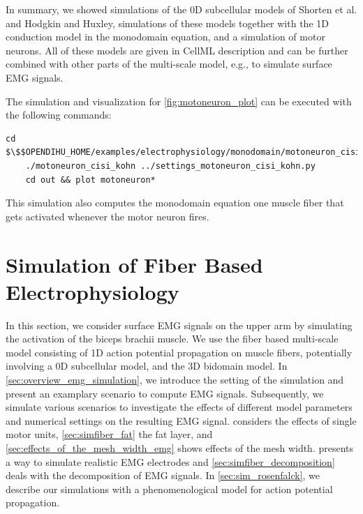 In summary, we showed simulations of the 0D subcellular models of Shorten et al. and Hodgkin and Huxley, simulations of these models together with the 1D conduction model in the monodomain equation, and a simulation of motor neurons. All of these models are given in CellML description and can be further combined with other parts of the multi-scale model, e.g., to simulate surface EMG signals.

\begin{reproduce_no_break}
  The simulation and visualization for \cref{fig:motoneuron_plot} can be executed with the following commands:
  \begin{lstlisting}[columns=fullflexible,breaklines=true,postbreak=\mbox{\textcolor{gray}{$\hookrightarrow$}\space}]
    cd $\$$OPENDIHU_HOME/examples/electrophysiology/monodomain/motoneuron_cisi_kohn/build_release
    ./motoneuron_cisi_kohn ../settings_motoneuron_cisi_kohn.py
    cd out && plot motoneuron*
  \end{lstlisting}
  This simulation also computes the monodomain equation one muscle fiber that gets activated whenever the motor neuron fires.
\end{reproduce_no_break}



\section{Simulation of Fiber Based Electrophysiology}\label{sec:results_fiber_based_electrophysiology}

In this section, we consider surface EMG signals on the upper arm by simulating the activation of the biceps brachii muscle. We use the fiber based multi-scale model consisting of 1D action potential propagation on muscle fibers, potentially involving a 0D subcellular model, and the 3D bidomain model.
In \cref{sec:overview_emg_simulation}, we introduce the setting of the simulation and present an examplary scenario to compute EMG signals.
Subsequently, we simulate various scenarios to investigate the effects of different model parameters and numerical settings on the resulting EMG signal.  considers the effects of single motor units, \cref{sec:simfiber_fat} the fat layer, and \cref{sec:effects_of_the_mesh_width_emg} shows effects of the mesh width.  presents a way to simulate realistic EMG electrodes and \cref{sec:simfiber_decomposition} deals with the decomposition of EMG signals.
In \cref{sec:sim_rosenfalck}, we describe our simulations with a phenomenological model for action potential propagation.

